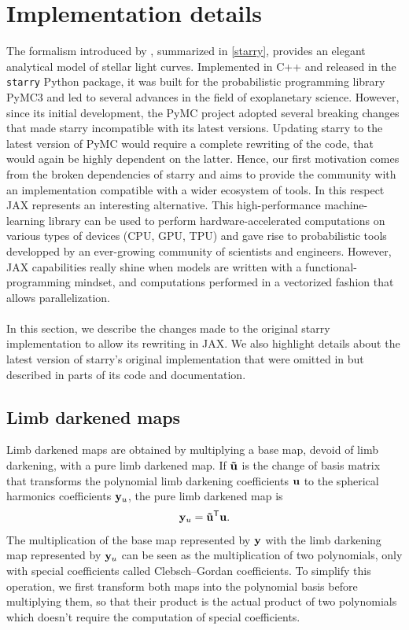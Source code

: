 \documentclass[modern]{aastex631}
\begin{document}
\section{Implementation details}\label{optimization}
The formalism introduced by \cite{starry}, summarized in \autoref{starry}, provides an elegant analytical model of stellar light curves. Implemented in C++ and released in the \texttt{starry} Python package, it was built for the probabilistic programming library \textsf{PyMC3} and led to several advances in the field of exoplanetary science. However, since its initial development, the \textsf{PyMC} project adopted several breaking changes that made \textsf{starry} incompatible with its latest versions. Updating \textsf{starry} to the latest version of \textsf{PyMC} would require a complete rewriting of the code, that would again be highly dependent on the latter. Hence, our first motivation comes from the broken dependencies of \textsf{starry} and aims to provide the community with an implementation compatible with a wider ecosystem of tools. In this respect \textsf{JAX} represents an interesting alternative. This high-performance machine-learning library can be used to perform hardware-accelerated computations on various types of devices (CPU, GPU, TPU) and gave rise to probabilistic tools developped by an ever-growing community of scientists and engineers. However, \textsf{JAX} capabilities really shine when models are written with a functional-programming mindset, and computations performed in a vectorized fashion that allows parallelization.\\\\
In this section, we describe the changes made to the original \textsf{starry} implementation to allow its rewriting in \textsf{JAX}. We also highlight details about the latest version of \textsf{starry}'s original implementation that were omitted in \citealt{starry} but described in parts of its code and documentation. 

\subsection{Limb darkened maps}
Limb darkened maps are obtained by multiplying a base map, devoid of limb darkening, with a pure limb darkened map. If ${\mathbf{\tilde u}}$ is the change of basis matrix that transforms the polynomial limb darkening coefficients ${\mathbf{u}}$ to the spherical harmonics coefficients ${\mathbf{y}}_u$, the pure limb darkened map is
\begin{equation}
    \label{eq:limb_darkening_map}
    \bvec{y}_u = \bvec{\tilde u}^\mathsf{T} \bvec{u}.
\end{equation}
The multiplication of the base map represented by ${\mathbf{y}}$ with the limb darkening map represented by ${\mathbf{y}}_u$ can be seen as the multiplication of two polynomials, only with special coefficients called Clebsch–Gordan coefficients. To simplify this operation, we first transform both maps into the polynomial basis before multiplying them, so that their product is the actual product of two polynomials which doesn't require the computation of special coefficients.
\end{document}
